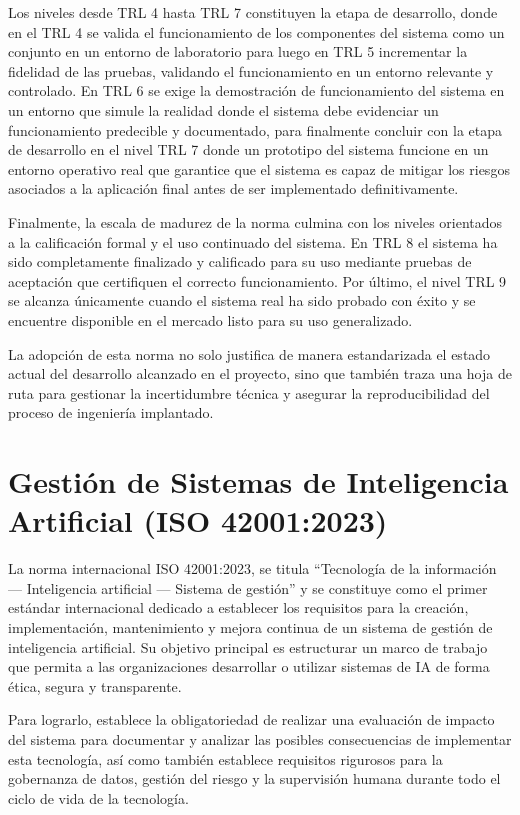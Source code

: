 Los niveles desde TRL 4 hasta TRL 7 constituyen la etapa de desarrollo, donde en el TRL 4 se valida el funcionamiento de los componentes del sistema como un conjunto en un entorno de laboratorio para luego en TRL 5 incrementar la fidelidad de las pruebas, validando el funcionamiento en un entorno relevante y controlado. En TRL 6 se exige la demostración de funcionamiento del sistema en un entorno que simule la realidad donde el sistema debe evidenciar un funcionamiento predecible y documentado, para finalmente concluir con la etapa de desarrollo en el nivel TRL 7 donde un prototipo del sistema funcione en un entorno operativo real que garantice que el sistema es capaz de mitigar los riesgos asociados a la aplicación final antes de ser implementado definitivamente.

Finalmente, la escala de madurez de la norma culmina con los niveles orientados a la calificación formal y el uso continuado del sistema. En TRL 8 el sistema ha sido completamente finalizado y calificado para su uso mediante pruebas de aceptación que certifiquen el correcto funcionamiento. Por último, el nivel TRL 9 se alcanza únicamente cuando el sistema real ha sido probado con éxito y se encuentre disponible en el mercado listo para su uso generalizado.

La adopción de esta norma no solo justifica de manera estandarizada el estado actual del desarrollo alcanzado en el proyecto, sino que también traza una hoja de ruta para gestionar la incertidumbre técnica y asegurar la reproducibilidad del proceso de ingeniería implantado.

\section{Gestión de Sistemas de Inteligencia Artificial (ISO 42001:2023)}\label{gestion-de-sistemas-de-inteligencia-artificial-iso-420012023}

La norma internacional ISO 42001:2023, se titula \enquote{Tecnología de la información --- Inteligencia artificial --- Sistema de gestión} y se constituye como el primer estándar internacional dedicado a establecer los requisitos para la creación, implementación, mantenimiento y mejora continua de un sistema de gestión de inteligencia artificial. Su objetivo principal es estructurar un marco de trabajo que permita a las organizaciones desarrollar o utilizar sistemas de IA de forma ética, segura y transparente.

Para lograrlo, establece la obligatoriedad de realizar una evaluación de impacto del sistema para documentar y analizar las posibles consecuencias de implementar esta tecnología, así como también establece requisitos rigurosos para la gobernanza de datos, gestión del riesgo y la supervisión humana durante todo el ciclo de vida de la tecnología.

